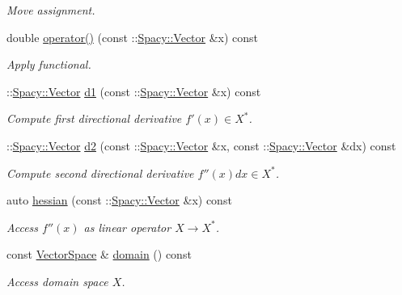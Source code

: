 \begin{DoxyCompactItemize}
\begin{DoxyCompactList}\small\item\em Move assignment. \end{DoxyCompactList}\item 
double \hyperlink{classSpacy_1_1FEniCS_1_1C2Functional_a92570dd624b596aadeb006a996a38776_a92570dd624b596aadeb006a996a38776}{operator()} (const \+::\hyperlink{classSpacy_1_1Vector}{Spacy\+::\+Vector} \&x) const 
\begin{DoxyCompactList}\small\item\em Apply functional. \end{DoxyCompactList}\item 
\+::\hyperlink{classSpacy_1_1Vector}{Spacy\+::\+Vector} \hyperlink{classSpacy_1_1FEniCS_1_1C2Functional_ab9b10dc982f81093c3125027b46c5876_ab9b10dc982f81093c3125027b46c5876}{d1} (const \+::\hyperlink{classSpacy_1_1Vector}{Spacy\+::\+Vector} \&x) const 
\begin{DoxyCompactList}\small\item\em Compute first directional derivative $f'(x) \in X^* $. \end{DoxyCompactList}\item 
\+::\hyperlink{classSpacy_1_1Vector}{Spacy\+::\+Vector} \hyperlink{classSpacy_1_1FEniCS_1_1C2Functional_affc6728db99f20f57ce75f16799084b4_affc6728db99f20f57ce75f16799084b4}{d2} (const \+::\hyperlink{classSpacy_1_1Vector}{Spacy\+::\+Vector} \&x, const \+::\hyperlink{classSpacy_1_1Vector}{Spacy\+::\+Vector} \&dx) const 
\begin{DoxyCompactList}\small\item\em Compute second directional derivative $f''(x)dx\in X^* $. \end{DoxyCompactList}\item 
auto \hyperlink{classSpacy_1_1FEniCS_1_1C2Functional_aceec6783f701e121b35ffa482629e1dd_aceec6783f701e121b35ffa482629e1dd}{hessian} (const \+::\hyperlink{classSpacy_1_1Vector}{Spacy\+::\+Vector} \&x) const 
\begin{DoxyCompactList}\small\item\em Access $f''(x)$ as linear operator $X\rightarrow X^*$. \end{DoxyCompactList}\item 
const \hyperlink{classSpacy_1_1VectorSpace}{Vector\+Space} \& \hyperlink{classSpacy_1_1C2FunctionalBase_a016d11deb1525e762bdfbe7e54250718_a016d11deb1525e762bdfbe7e54250718}{domain} () const 
\begin{DoxyCompactList}\small\item\em Access domain space $X$. \end{DoxyCompactList}\end{DoxyCompactItemize}


